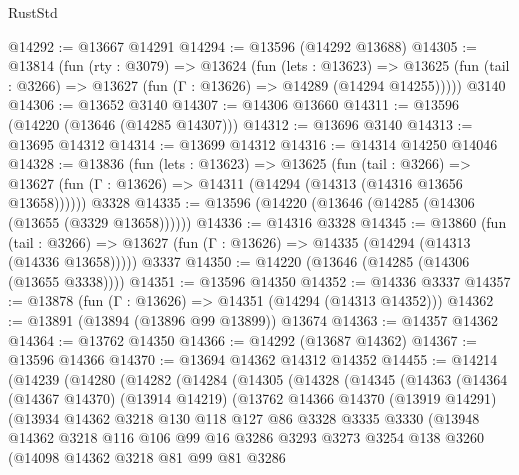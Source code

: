 \begin{lexlean}{RustStd}
\begin{coremodule}
{\begin{coremodule}
{{{{{{{{{{{{{{{{{{{{{{{{{{{{{{{{{{{{{{{@14292 := @13667 @14291
@14294 := @13596 (@14292 @13688)
@14305 := @13814
    (fun (rty : @3079) =>
    @13624
      (fun (lets : @13623) =>
      @13625 (fun (tail : @3266) => @13627 (fun (Γ : @13626) => @14289 (@14294 @14255)))))
    @3140
@14306 := @13652 @3140
@14307 := @14306 @13660
@14311 := @13596 (@14220 (@13646 (@14285 @14307)))
@14312 := @13696 @3140
@14313 := @13695 @14312
@14314 := @13699 @14312
@14316 := @14314 @14250 @14046
@14328 := @13836
    (fun (lets : @13623) =>
    @13625
      (fun (tail : @3266) =>
      @13627 (fun (Γ : @13626) => @14311 (@14294 (@14313 (@14316 @13656 @13658))))))
    @3328
@14335 := @13596 (@14220 (@13646 (@14285 (@14306 (@13655 (@3329 @13658))))))
@14336 := @14316 @3328
@14345 := @13860
    (fun (tail : @3266) => @13627 (fun (Γ : @13626) => @14335 (@14294 (@14313 (@14336 @13658)))))
    @3337
@14350 := @14220 (@13646 (@14285 (@14306 (@13655 @3338))))
@14351 := @13596 @14350
@14352 := @14336 @3337
@14357 := @13878 (fun (Γ : @13626) => @14351 (@14294 (@14313 @14352)))
@14362 := @13891 (@13894 (@13896 @99 @13899)) @13674
@14363 := @14357 @14362
@14364 := @13762 @14350
@14366 := @14292 (@13687 @14362)
@14367 := @13596 @14366
@14370 := @13694 @14362 @14312 @14352
@14455 := @14214
    (@14239
      (@14280
        (@14282
          (@14284
            (@14305
              (@14328
                (@14345
                  (@14363
                    (@14364
                      (@14367 @14370)
                      (@13914 @14219)
                      (@13762
                        @14366
                        @14370
                        (@13919 @14291)
                        (@13934
                          @14362
                          @3218
                          @130
                          @118
                          @127
                          @86
                          @3328
                          @3335
                          @3330
                          (@13948
                            @14362
                            @3218
                            @116
                            @106
                            @99
                            @16
                            @3286
                            @3293
                            @3273
                            @3254
                            @138
                            @3260
                            (@14098
                              @14362
                              @3218
                              @81
                              @99
                              @81
                              @3286
}}}}}}}}}}}}}}}}}}}}}}}}}}}}}}}}}}}}}}}
\end{coremodule}}
\end{coremodule}
\end{lexlean}
